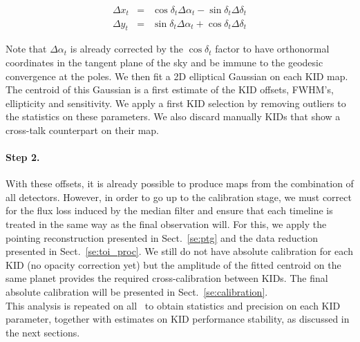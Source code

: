 \begin{eqnarray}
\Delta x_t &=& \cos\delta_t \Delta\alpha_t - \sin \delta_t\Delta \delta_t \nonumber \\
\Delta y_t &=& \sin\delta_t \Delta\alpha_t + \cos \delta_t\Delta \delta_t \nonumber
\end{eqnarray}

Note that $\Delta\alpha_t$ is already corrected by the $\cos\delta_t$ factor to
have orthonormal coordinates in the tangent plane of the sky and be immune to
the geodesic convergence at the poles. We then fit a 2D elliptical Gaussian on
each KID map. The centroid of this Gaussian is a first estimate of the KID
offsets, FWHM's, ellipticity and sensitivity. We apply a first KID selection by
removing outliers to the statistics on these parameters. We also discard
manually KIDs that show a cross-talk counterpart on their map.

\paragraph{Step 2.} With these offsets, it is already possible to produce maps
from the combination of all detectors. However, in order to go up to
the calibration stage, we must correct for the flux loss induced by
the median filter and ensure that each timeline is treated in the same
way as the final observation will. For this, we apply the pointing
reconstruction presented in Sect.~\ref{se:ptg} and the data reduction
presented in Sect.~\ref{se:toi_proc}. We still do not have absolute
calibration for each KID (no opacity correction yet) but the amplitude
of the fitted centroid on the same planet provides the required
cross-calibration between KIDs. The final absolute calibration will be
presented in Sect.~\ref{se:calibration}.\\

This analysis is repeated on all \bms\ to obtain statistics and
precision on each KID parameter, together with estimates on KID
performance stability, as discussed in the next sections.


